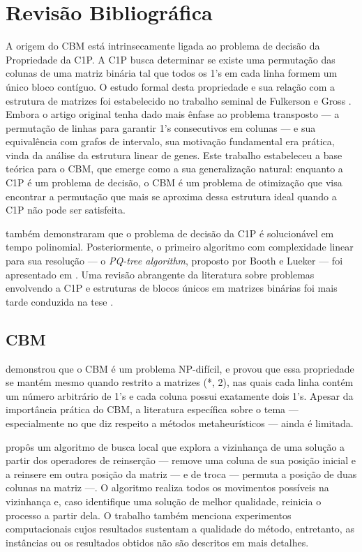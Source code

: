 \chapter{Revisão Bibliográfica}
\label{review}

A origem do CBM está intrinsecamente ligada ao problema de decisão da Propriedade da C1P. A C1P busca determinar se existe uma permutação das colunas de uma matriz binária tal que todos os 1's em cada linha formem um único bloco contíguo. O estudo formal desta propriedade e sua relação com a estrutura de matrizes foi estabelecido no trabalho seminal de Fulkerson e Gross \cite{fulkerson1965incidence}. Embora o artigo original tenha dado mais ênfase ao problema transposto — a permutação de linhas para garantir 1's consecutivos em colunas — e sua equivalência com grafos de intervalo, sua motivação fundamental era prática, vinda da análise da estrutura linear de genes. Este trabalho estabeleceu a base teórica para o CBM, que emerge como a sua generalização natural: enquanto a C1P é um problema de decisão, o CBM é um problema de otimização que visa encontrar a permutação que mais se aproxima dessa estrutura ideal quando a C1P não pode ser satisfeita.

 também demonstraram que o problema de decisão da C1P é solucionável em tempo polinomial. Posteriormente, o primeiro algoritmo com complexidade linear para sua resolução — o \textit{PQ-tree algorithm}, proposto por Booth e Lueker — foi apresentado em . Uma revisão abrangente da literatura sobre problemas envolvendo a C1P e estruturas de blocos únicos em matrizes binárias foi mais tarde conduzida na tese .

\section{CBM}

 demonstrou que o CBM é um problema NP-difícil, e  provou que essa propriedade se mantém mesmo quando restrito a matrizes (*, 2), nas quais cada linha contém um número arbitrário de 1’s e cada coluna possui exatamente dois 1’s. Apesar da importância prática do CBM, a literatura específica sobre o tema — especialmente no que diz respeito a métodos metaheurísticos — ainda é limitada.

 propôs um algoritmo de busca local que explora a vizinhança de uma solução a partir dos operadores de reinserção — remove uma coluna de sua posição inicial e a reinsere em outra posição da matriz — e de troca — permuta a posição de duas colunas na matriz —. O algoritmo realiza todos os movimentos possíveis na vizinhança e, caso identifique uma solução de melhor qualidade, reinicia o processo a partir dela. O trabalho também menciona experimentos computacionais cujos resultados sustentam a qualidade do método, entretanto, as instâncias ou os resultados obtidos não são descritos em mais detalhes.

